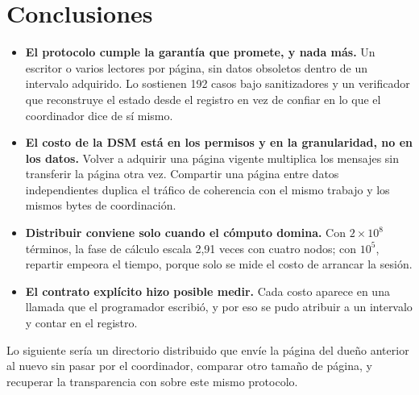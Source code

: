 \section{Conclusiones}

\begin{itemize}
\item \textbf{El protocolo cumple la garantía que promete, y nada más.} Un
      escritor o varios lectores por página, sin datos obsoletos dentro de un
      intervalo adquirido. Lo sostienen 192 casos bajo sanitizadores y un
      verificador que reconstruye el estado desde el registro en vez de
      confiar en lo que el coordinador dice de sí mismo.

\item \textbf{El costo de la DSM está en los permisos y en la granularidad,
      no en los datos.} Volver a adquirir una página vigente multiplica los
      mensajes sin transferir la página otra vez. Compartir una página entre
      datos independientes duplica el tráfico de coherencia con el mismo
      trabajo y los mismos bytes de coordinación.

\item \textbf{Distribuir conviene solo cuando el cómputo domina.} Con
      $2\times10^{8}$ términos, la fase de cálculo escala 2,91 veces con cuatro
      nodos; con $10^{5}$, repartir empeora el tiempo, porque solo se mide el
      costo de arrancar la sesión.

\item \textbf{El contrato explícito hizo posible medir.} Cada costo aparece en
      una llamada que el programador escribió, y por eso se pudo atribuir a un
      intervalo y contar en el registro.
\end{itemize}

Lo siguiente sería un directorio distribuido que envíe la página del dueño
anterior al nuevo sin pasar por el coordinador, comparar otro tamaño de
página, y recuperar la transparencia con  sobre este mismo
protocolo.
